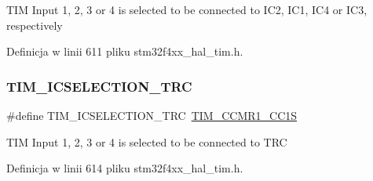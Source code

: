 T\+IM Input 1, 2, 3 or 4 is selected to be connected to I\+C2, I\+C1, I\+C4 or I\+C3, respectively 

Definicja w linii 611 pliku stm32f4xx\+\_\+hal\+\_\+tim.\+h.

\mbox{\label{group___t_i_m___input___capture___selection_ga9e0191bbf1a82dd9150b9283c39276e7}} 
\subsubsection{\texorpdfstring{T\+I\+M\+\_\+\+I\+C\+S\+E\+L\+E\+C\+T\+I\+O\+N\+\_\+\+T\+RC}{TIM\_ICSELECTION\_TRC}}
{\footnotesize\ttfamily \#define T\+I\+M\+\_\+\+I\+C\+S\+E\+L\+E\+C\+T\+I\+O\+N\+\_\+\+T\+RC~\hyperlink{group___peripheral___registers___bits___definition_ga95291df1eaf532c5c996d176648938eb}{T\+I\+M\+\_\+\+C\+C\+M\+R1\+\_\+\+C\+C1S}}

T\+IM Input 1, 2, 3 or 4 is selected to be connected to T\+RC 

Definicja w linii 614 pliku stm32f4xx\+\_\+hal\+\_\+tim.\+h.

